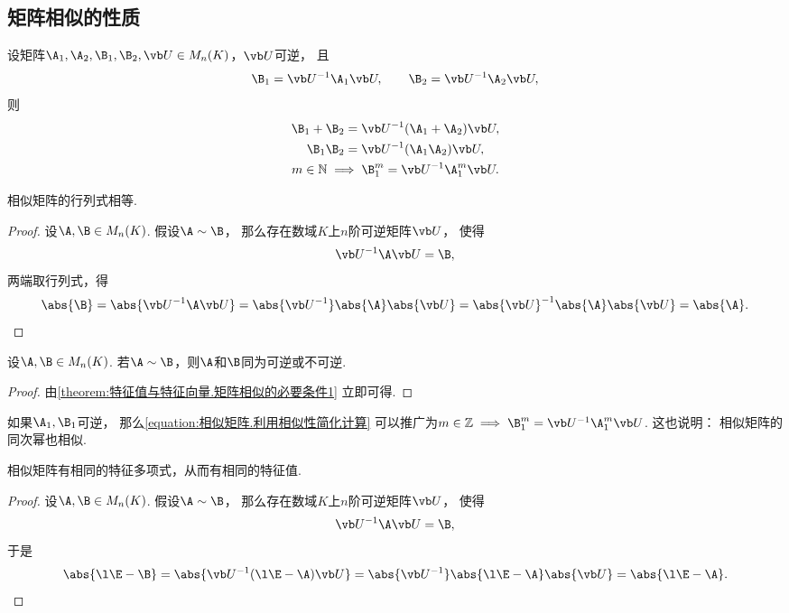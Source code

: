 \subsection{矩阵相似的性质}
\begin{proposition}
设矩阵\(\A_1,\A_2,\B_1,\B_2,\P \in M_n(K)\)，\(\P\)可逆，
且\[
	\B_1=\P^{-1}\A_1\P, \qquad
	\B_2=\P^{-1}\A_2\P,
\]
则\begin{gather}
	\B_1 + \B_2 = \P^{-1} (\A_1 + \A_2) \P, \\
	\B_1 \B_2 = \P^{-1} (\A_1 \A_2) \P, \\
	m\in\mathbb{N} \implies \B_1^m = \P^{-1}\A_1^m\P.
		\label{equation:相似矩阵.利用相似性简化计算}
\end{gather}
\end{proposition}

\begin{property}\label{theorem:特征值与特征向量.矩阵相似的必要条件1}
相似矩阵的行列式相等.
\begin{proof}
设\(\A,\B \in M_n(K)\).
假设\(\A\sim\B\)，
那么存在数域\(K\)上\(n\)阶可逆矩阵\(\P\)，
使得\[
	\P^{-1}\A\P=\B,
\]
两端取行列式，得\[
	\abs{\B} = \abs{\P^{-1}\A\P}
	= \abs{\P^{-1}}\abs{\A}\abs{\P}
	= \abs{\P}^{-1}\abs{\A}\abs{\P}
	= \abs{\A}.
	\qedhere
\]
\end{proof}
\end{property}
\begin{proposition}
设\(\A,\B \in M_n(K)\).
若\(\A\sim\B\)，则\(\A\)和\(\B\)同为可逆或不可逆.
\begin{proof}
由\cref{theorem:特征值与特征向量.矩阵相似的必要条件1} 立即可得.
\end{proof}
\end{proposition}
\begin{remark}
如果\(\A_1,\B_1\)可逆，
那么\cref{equation:相似矩阵.利用相似性简化计算}
可以推广为\(m\in\mathbb{Z} \implies \B_1^m = \P^{-1}\A_1^m\P\).
这也说明：
相似矩阵的同次幂也相似.
\end{remark}

\begin{property}\label{theorem:特征值与特征向量.矩阵相似的必要条件3}
相似矩阵有相同的特征多项式，从而有相同的特征值.
\begin{proof}
设\(\A,\B \in M_n(K)\).
假设\(\A\sim\B\)，
那么存在数域\(K\)上\(n\)阶可逆矩阵\(\P\)，
使得\[
	\P^{-1}\A\P=\B,
\]
于是\[
	\abs{\l\E-\B}
	=\abs{\P^{-1}(\l\E-\A)\P}
	=\abs{\P^{-1}}\abs{\l\E-\A}\abs{\P}
	=\abs{\l\E-\A}.
	\qedhere
\]
\end{proof}
\end{property}

